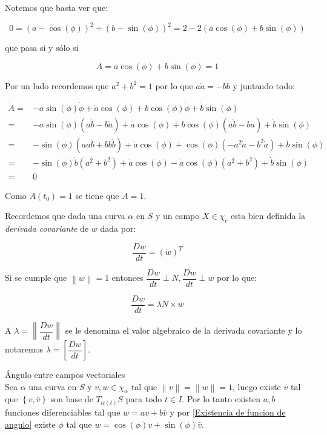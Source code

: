 \documentclass[11pt]{article}
\newcommand\norm[1]{\left\lVert#1\right\rVert}
\newcommand{\sett}[1]{\left\lbrace#1\right\rbrace}
\newenvironment{proof}[1][Demostraci\'on]{\begin{trivlist}
		\item[\hskip \labelsep {\bfseries #1}]}{\end{trivlist}}
\newenvironment{definition}[1][Definici\'on]{\begin{trivlist}
		\item[\hskip \labelsep {\bfseries #1}]}{\end{trivlist}}
\newcommand{\qed}{\nobreak \ifvmode \relax \else
	\ifdim\lastskip<1.5em \hskip-\lastskip
	\hskip1.5em plus0em minus0.5em \fi \nobreak
	\vrule height0.75em width0.5em depth0.25em\fi}
\begin{document}
\begin{proof}
	Notemos que basta ver que:
	
	\[
	0 = (a- \cos(\phi))^2 + (b- \sin(\phi))^2 = 2 - 2 \left(a \cos(\phi) + b \sin(\phi)\right)
	\]
	
	que pasa si y s\'olo si
	
	\[
	A = a \cos(\phi) + b \sin(\phi) = 1
	\]
	
	Por un lado recordemos que $a^2 + b^2 = 1$ por lo que $a\dot{a} = - b \dot{b}$ y juntando todo:

	\begin{equation*}
		\begin{aligned}
			\dot{A} = & -a \sin(\phi)\dot{\phi} + \dot{a}\cos(\phi) +b \cos(\phi)\dot{\phi} + \dot{b}\sin(\phi) \\
					= & -a \sin(\phi) \left(a\dot{b} - b\dot{a}\right)+ \dot{a}\cos(\phi) +b \cos(\phi)\left(a\dot{b} - b\dot{a}\right) + \dot{b}\sin(\phi) \\
					= & -\sin(\phi) \left(aa\dot{b} + bb \dot{b}\right)+ \dot{a}\cos(\phi)  + \cos(\phi)\left(- a^2\dot{a} - b^2\dot{a}\right) + \dot{b}\sin(\phi) \\
					= & -\sin(\phi)\dot{b}  \left(a^2+ b^2 \right)+ \dot{a}\cos(\phi)  - \dot{a}  \cos(\phi)\left( a^2 + b^2 \right) + \dot{b}\sin(\phi) \\
					= & 0
		\end{aligned}
	\end{equation*}
	
	Como $A(t_0) = 1$ se tiene que $A = 1$. \qed
	
\end{proof}

Recordemos que dada una curva $\alpha$ en $S$ y un campo $X \in \chi_c$ esta bien definida la \textit{derivada covariante} de $w$ dada por:

\begin{equation*}
	\dfrac{Dw}{dt} = \left(\dot{w} \right)^{T}
\end{equation*}

Si se cumple que $\norm{w} = 1$ entonces $\dfrac{Dw}{dt} \perp N, \dfrac{Dw}{dt} \perp w$ por lo que:

\[
\dfrac{Dw}{dt} = \lambda N \times w
\]

A $\lambda = \norm{\dfrac{Dw}{dt}}$ se le denomina el valor algebraico de la derivada covariante y lo notaremos $\lambda = \left[\dfrac{Dw}{dt}\right]$.

\begin{definition}{\'Angulo entre campos vectoriales}
	\\
	
	Sea $\alpha$ una curva en $S$ y $v,w \in \chi_{\alpha}$ tal que $\norm{v} = \norm{w} = 1$, luego existe $\bar{v}$ tal que $\sett{v,\bar{v}}$ son base de $T_{\alpha(t)} S$ para todo $t \in I$. Por lo tanto existen $a,b$ funciones diferenciables tal que $w = av + b \bar{v}$ y por \ref{Existencia de funcion de angulo} existe $\phi$ tal que $w = \cos(\phi)v + \sin(\phi) \bar{v}$.
	
\end{definition}
\end{document}
